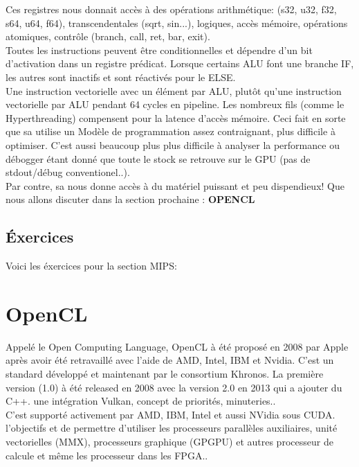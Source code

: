 \documentclass[oneside]{book}
\begin{document}
Ces registres nous donnait accès à des opérations arithmétique: (s32, u32, f32, s64, u64, f64),
transcendentales (sqrt, sin...), logiques, accès mémoire,
opérations atomiques, contrôle (branch, call, ret, bar, exit).\\

Toutes les instructions peuvent être conditionnelles et
dépendre d'un bit d'activation dans un registre prédicat. Lorsque certains ALU font une branche IF, les autres sont
inactifs et sont réactivés pour le ELSE.\\

Une instruction vectorielle avec un élément par ALU, plutôt qu'une instruction vectorielle par ALU pendant 64 cycles en pipeline. Les nombreux fils (comme le Hyperthreading) compensent
pour la latence d'accès mémoire. Ceci fait en sorte que sa utilise un Modèle de programmation assez contraignant, plus difficile à
optimiser. C'est aussi beaucoup plus plus difficile à analyser la performance ou débogger étant donné que toute le stock se retrouve sur le GPU (pas de stdout/débug conventionel..).\\

Par contre, sa nous donne accès à du matériel puissant et peu dispendieux! Que nous allons discuter dans la section prochaine : \textbf{OPENCL}

\section{Éxercices}

Voici les éxercices pour la section MIPS:


\chapter{OpenCL}
Appelé le Open Computing Language, OpenCL à été proposé en 2008 par Apple après avoir été retravaillé avec l'aide de AMD, Intel, IBM et Nvidia. C'est un standard développé et maintenant par le consortium Khronos. La première version (1.0) à été released en 2008 avec la version 2.0 en 2013 qui a ajouter du C++. une intégration Vulkan, concept de priorités, minuteries.. \\

C'est supporté activement par AMD, IBM, Intel et aussi NVidia sous CUDA. \\

l'objectifs et de permettre d'utiliser les processeurs parallèles auxiliaires, unité vectorielles (MMX), processeurs graphique (GPGPU) et autres processeur de calcule et même les processeur dans les FPGA.. \\
\end{document}
